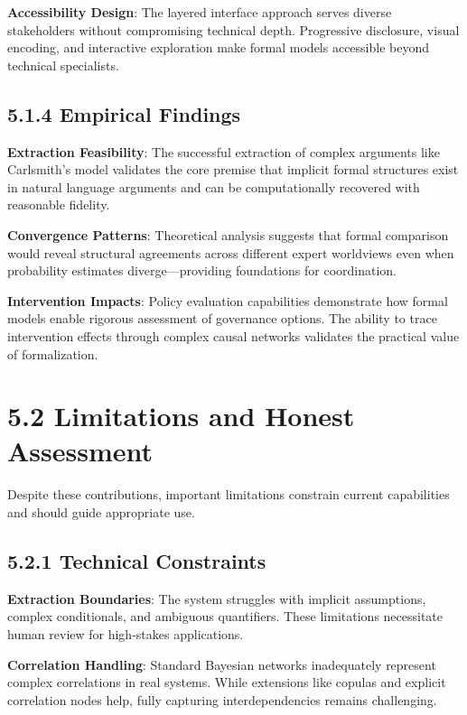 \documentclass[
  11pt,
  letterpaper,
  openany]{book}
\begin{document}
\textbf{Accessibility Design}: The layered interface approach serves
diverse stakeholders without compromising technical depth. Progressive
disclosure, visual encoding, and interactive exploration make formal
models accessible beyond technical specialists.

\subsection{5.1.4 Empirical Findings}\label{sec-empirical-findings}

\textbf{Extraction Feasibility}: The successful extraction of complex
arguments like Carlsmith's model validates the core premise that
implicit formal structures exist in natural language arguments and can
be computationally recovered with reasonable fidelity.

\textbf{Convergence Patterns}: Theoretical analysis suggests that formal
comparison would reveal structural agreements across different expert
worldviews even when probability estimates diverge---providing
foundations for coordination.

\textbf{Intervention Impacts}: Policy evaluation capabilities
demonstrate how formal models enable rigorous assessment of governance
options. The ability to trace intervention effects through complex
causal networks validates the practical value of formalization.

\section{5.2 Limitations and Honest
Assessment}\label{sec-limitations-assessment}

Despite these contributions, important limitations constrain current
capabilities and should guide appropriate use.

\subsection{5.2.1 Technical
Constraints}\label{sec-technical-constraints}

\textbf{Extraction Boundaries}: The system struggles with implicit
assumptions, complex conditionals, and ambiguous quantifiers. These
limitations necessitate human review for high-stakes applications.

\textbf{Correlation Handling}: Standard Bayesian networks inadequately
represent complex correlations in real systems. While extensions like
copulas and explicit correlation nodes help, fully capturing
interdependencies remains challenging.
\end{document}
